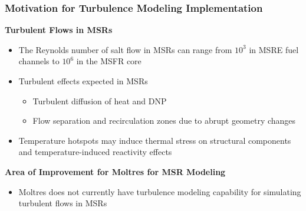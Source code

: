 \begin{frame}
  \frametitle{Motivation for Turbulence Modeling Implementation}
  \textbf{Turbulent Flows in MSRs}
  \begin{itemize}
    \item The Reynolds number of salt flow in MSRs can range from $10^3$ in MSRE fuel channels
      \cite{kedl_fluid_1970} to $10^6$ in the MSFR core \cite{fiorina_modelling_2014}
    \item Turbulent effects expected in MSRs
    \begin{itemize}
      \item Turbulent diffusion of heat and \gls{DNP}
      \item Flow separation and recirculation zones due to abrupt geometry changes
    \end{itemize}
    \item Temperature hotspots may induce thermal stress on structural
      components and temperature-induced reactivity effects
  \end{itemize}
  \pause
  \begin{block}{\textbf{Area of Improvement for Moltres for MSR Modeling}}
    \begin{itemize}
      \item Moltres does not currently have turbulence modeling capability for simulating
        turbulent flows in MSRs
    \end{itemize}
  \end{block}
\end{frame}
